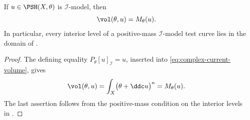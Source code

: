 \begin{lemma}\label{lem:ok-i-model-mass-volume}
If \(u\in\PSH(X,\theta)\) is \(\mathcal I\)-model, then
\[
                         \vol(\theta,u)=M_\theta(u).
\]
In particular, every interior level of a positive-mass
\(\mathcal I\)-model test curve lies in the domain of
.
\end{lemma}

\begin{proof}
The defining equality \(P_\theta[u]_{\mathcal I}=u\), inserted into
\eqref{eq:complex-current-volume}, gives
\[
 \vol(\theta,u)
 =\int_X\bigl(\theta+\ddc u\bigr)^n
 =M_\theta(u).
\]
The last assertion follows from the positive-mass condition on the interior
levels in .
\end{proof}

